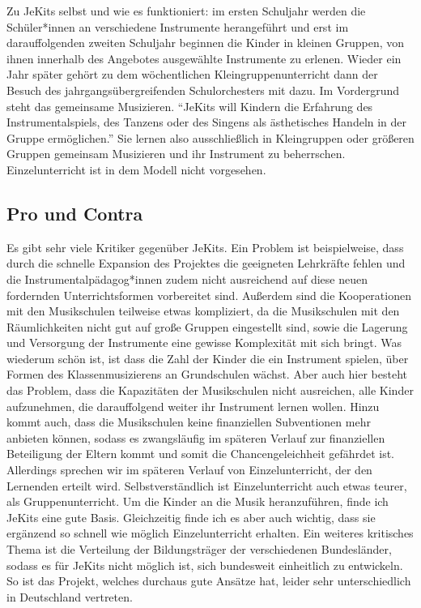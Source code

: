 Zu JeKits selbst und wie es funktioniert: im ersten Schuljahr werden die
Schüler*innen an verschiedene Instrumente herangeführt und erst im
darauffolgenden zweiten Schuljahr beginnen die Kinder in kleinen Gruppen, von
ihnen innerhalb des Angebotes ausgewählte Instrumente zu erlenen. Wieder ein
Jahr später gehört zu dem wöchentlichen Kleingruppenunterricht dann der Besuch
des jahrgangsübergreifenden Schulorchesters mit dazu. Im Vordergrund steht das
gemeinsame Musizieren. \enquote{JeKits will Kindern die Erfahrung des
Instrumentalspiels, des Tanzens oder des Singens als ästhetisches Handeln in der
Gruppe ermöglichen.}
\autocite{https://de.wikipedia.org/wiki/JeKits}
Sie lernen also ausschließlich in Kleingruppen oder größeren Gruppen gemeinsam
Musizieren und ihr Instrument zu beherrschen. Einzelunterricht ist in dem Modell
nicht vorgesehen.


\subsection{Pro und Contra}
Es gibt sehr viele Kritiker gegenüber JeKits. Ein Problem ist beispielweise,
dass durch die schnelle Expansion des Projektes die geeigneten Lehrkräfte fehlen
und die Instrumentalpädagog*innen zudem nicht ausreichend auf diese neuen
fordernden Unterrichtsformen vorbereitet sind. Außerdem sind die Kooperationen
mit den Musikschulen teilweise etwas kompliziert, da die Musikschulen mit den
Räumlichkeiten nicht gut auf große Gruppen eingestellt sind, sowie die Lagerung
und Versorgung der Instrumente eine gewisse Komplexität mit sich bringt. Was
wiederum schön ist, ist dass die Zahl der Kinder die ein Instrument spielen,
über Formen des Klassenmusizierens an Grundschulen wächst.
\autocite[119]{ernst:die_zukunftsfaehige_musikschule} Aber auch hier besteht das
Problem, dass die Kapazitäten der Musikschulen nicht ausreichen, alle Kinder
aufzunehmen, die darauffolgend weiter ihr Instrument lernen wollen. Hinzu kommt
auch, dass die Musikschulen keine finanziellen Subventionen mehr anbieten
können, sodass es zwangsläufig im späteren Verlauf zur finanziellen Beteiligung
der Eltern kommt und somit die Chancengeleichheit gefährdet ist. Allerdings
sprechen wir im späteren Verlauf von Einzelunterricht, der den Lernenden erteilt
wird. Selbstverständlich ist Einzelunterricht auch etwas teurer, als
Gruppenunterricht. Um die Kinder an die Musik heranzuführen, finde ich JeKits
eine gute Basis. Gleichzeitig finde ich es aber auch wichtig, dass sie ergänzend
so schnell wie möglich Einzelunterricht erhalten. Ein weiteres kritisches Thema
ist die Verteilung der Bildungsträger der verschiedenen Bundesländer, sodass es
für JeKits nicht möglich ist, sich bundesweit einheitlich zu entwickeln. So ist
das Projekt, welches durchaus gute Ansätze hat, leider sehr unterschiedlich in
Deutschland vertreten. 
